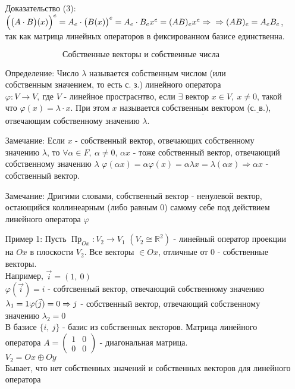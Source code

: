 \documentclass[12pt, letterpaper, twoside]{article}
\newcommand{\Underl}[1]{$\underline{\text{#1}}$}
\newcommand{\mb}[1]{\mathbb{#1}}
\begin{document}
        \begin{enumerate}
            \item[Доказательство (3):] $\Big(\big(A\cdot B\big)(x)\Big)^e = A_e\cdot \big(B(x)\big)^e = A_e \cdot B_e x^e = (AB)_e x^e\Rightarrow\\
            \Rightarrow (AB)_e = A_e B_e$, так как матрица линейных операторов в фиксированном базисе единственна. 
        \end{enumerate}
        \[\text{Собственные векторы и собственные числа}\]
        \begin{enumerate}
            \item[Определение:] Число $\lambda$ называется \Underl{собственным числом} (или \Underl{собственным значением}, то есть \Underl{с. з.}) линейного оператора
            $\varphi: V\longrightarrow V,\ \text{где $V$ - линейное простраснтво}$, если $\exists$ вектор $x\in V,\ x\neq 0$, такой что $\varphi(x) = \lambda\cdot x$. При этом $x$ называется \Underl{собственным вектором} (\Underl{с. в.}), отвечающим собственному значению $\lambda$.
            \item[Замечание:] Если $x$ - собственный вектор, отвечающих собственному значению $\lambda$, то $\forall \alpha \in F,\ \alpha \neq 0$, $\alpha x$ - тоже собственный вектор, отвечающий собственному значению $\lambda$
            $\varphi(\alpha x) = \alpha \varphi(x) = \alpha \lambda x = \lambda (\alpha x)\Rightarrow \alpha x$ - собственный вектор.
            \item[Замечание:] Дригими словами, собственный вектор - ненулевой вектор, остающийся коллинеарным (либо равным 0) самому себе под действием линейного оператора $\varphi$
            \item[Пример 1:] Пусть $\operatorname{\text{Пр}}_{Ox}: V_2\longrightarrow V_1$ $(V_2 \cong \mb{R}^2)$ - линейный оператор проекции на $Ox$ в плоскости $V_2$. Все векторы $\in Ox$, отличные от $0$ - собственные векторы.\\
            Например, $\vec{i} = (1,\ 0)$\\
            $\varphi(\vec{i}) = i$ - собтсвенный вектор, отвечающий собственному значению $\lambda_1 = 1\\
            \varphi(\vec{j}) = 0\Rightarrow j$ - собственный вектор, отвечающий собственному значению $\lambda_2 = 0 $\\
            В базисе $\{i,\ j\}$ - базис из собственных векторов. Матрица линейного оператора $A = \begin{pmatrix}
                1 & 0\\
                0 & 0
            \end{pmatrix}$ - диагональная матрица.\\
            $V_2 = Ox \oplus Oy$\\
            Бывает, что нет собственных значений и собственных векторов для линейного оператора 
        \end{enumerate}\newpage
\end{document}
